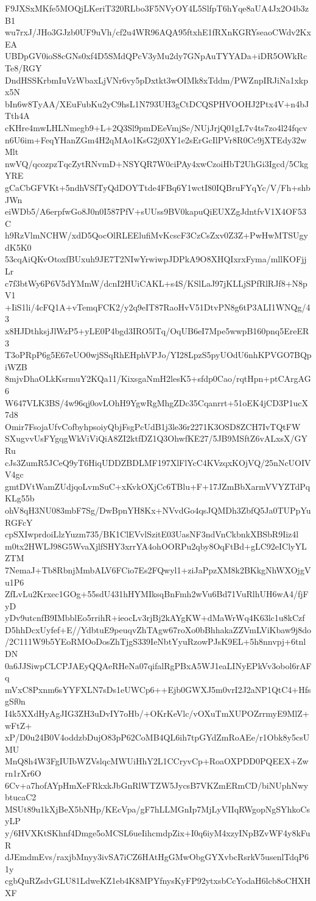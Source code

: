 F9JXSxMKfe5MOQjLKeriT320RLbo3F5NVyOY4L5SlfpT6hYqe8aUA4Jx2O4b3zB1
wu7rxJ/JHo3GJzb0UF9uVh/cf2u4WR96AQA95ftxhE1fRXnKGRYseaoCWdv2KxEA
UBDpGV0ioS8cGNs0xf4D5SMdQPcV3yMu2dy7GNpAuTYYADa+iDR5OWkRcTe8/RGY
DndHSSKrbmIuVzWbaxLjVNr6vy5pDxtkt3wOIMk8xTddm/PWZnpIRJiNa1xkpx5N
bIn6w8TyAA/XEuFubKu2yC9hsL1N793UH3gCtDCQSPHVOOHJ2Ptx4V+n4bJTth4A
cKHre4mwLHLNmegb9+L+2Q3Sl9pmDEeVmjSe/NUjJrjQ01gL7v4ts7zo4l24fqcv
n6U6im+FeqYHanZGm4H2qMAo1KsG2j0XY1e2sErGcIlPVr8R0Cc9jXTEdy32wMlt
nwVQ/qcozpzTqcZytRNvmD+NSYQR7W0ciPAy4xwCzoiHbT2UhGi3Igcd/5CkgYRE
gCaCbGFVKt+5ndhVSfTyQdDOYTtde4FBq6Y1wctI80IQBruFYqYc/V/Fh+shbJWn
eiWDb5/A6erpfwGo8J0n0I587PfV+sUUss9BV0kapuQiEUXZgJdntfvV1X4OF53C
h9RzVlmNCHW/xdD5QocOlRLEElufiMvKcscF3CzCsZxv0Z3Z+PwHwMTSUgydK5K0
53cqAiQKvOtoxfBUxuh9JE7T2NIwYrwiwpJDPkA9O8XHQIxrxFyma/mllKOFjjLr
c7f3btWy6P6V5dYMmW/dcnI2HUiCAKL+s4S/KSlLaJ97jKLLjSPfRlRJf8+N8pV1
+IiS1li/4cFQ1A+vTemqFCK2/y2q9eIT87RaoHvV51DtvPN8g6tP3ALI1WNQg/43
x8HJDthksjJlWzP5+yLE0P4bgd3IRO5lTq/OqUB6eI7Mpe5wwpB160pnq5EreER3
T3oPRpP6g5E67eUO0wjSSqRhEHphVPJo/YI28LpzS5pyUOdU6nhKPVGO7BQpiWZB
8mjvDhaOLkKsrmuY2KQa11/KixsgaNmH2lesK5+sfdp0Cao/rqtHpn+ptCArgAG6
W647VLK3BS/4w96qj0ovLOhH9YgwRgMhgZDc35Cqanrrt+51oEK4jCD3P1ucX7d8
Omir7FsojaUfvCofbyhpsoiyQbjFsgPcUdB1j3le36r2271K3OSD8ZCH7IvTQtFW
SXugvvUsFYgqgWkViViQiA8ZI2ktfDZ1Q3OhwfKE27/5JB9MSftZ6vALxsX/GYRu
cJs3ZumR5JCeQ9yT6HiqUDDZBDLMF197XlFlYcC4KVzqxKOjVQ/25nNcUOIVV4gc
gmtDVtWamZUdjqoLvmSuC+xKvkOXjCc6TBlu+F+17JZmBbXarmVVYZTdPqKLg55b
ohV8qH3NU083mbF7Sg/DwBpnYH8Kx+NVvdGo4qsJQMDh3ZbfQ5Ja0TUPpYuRGFcY
cpSXIwprdoiLlzYuzm735/BK1ClEVvlSzitE03UasNF3ndVnCkbnkXBSbR9Iiz4l
m0tx2HWLJ98G5WvaXjlfSHY3xrrYA4ohOORPu2qby8OqFtBd+gLC92eIClyYLZTM
7NemaJ+Tb8RbnjMmbALV6FCio7Es2FQwyl1+ziJaPpzXM8k2BKkgNhWXOjgVu1P6
ZfLvLu2Krxec1GOg+55sdU431hHYMIksqBnFmh2wVu6Bd71VuRlhUH6wA4/fjFyD
yDv9utcnfB9IMbblEo5rrihR+ieocLv3rjBj2kAYgKW+dMaWrWq4K63lc1u8kCzf
D5hhDcxUyfef+E//YdbtuE9peuqvZhTAgw67roXo0bBhhakaZZVmLViKbaw9j8do
/2C111W9b5YEoRMOoDosZhTjgS339IeNbtYyuRzowPJsK9EL+5h8nnvpj+6tnlDN
0a6JJSiwpCLCPJAEyQQAeRHeNa07qifalRgPBxA5WJ1eaLINyEPkVv3obol6rAFq
mVxC8Pxnm6sYYFXLN7sDs1eUWCp6++Ejb0GWXJ5m0vrI2J2aNP1QtC4+HfsgSf0n
I4k5XXdHyAgJIG3ZH3uDvIY7oHb/+OKrKeVlc/vOXuTmXUPOZrrmyE9MlZ+wFtZ+
xP/D0u24B0V4oddzbDujO83pP62CoMB4QL6ih7tpGYdZmRoAEe/r1Obk8y5csUMU
MnQ8h4W3FgIUIbWZVslqcMWUiHhY2L1CCryvCp+RoaOXPDD0PQEEX+Zwrn1rXr6O
6Cv+a7hofAYpHmXeFRkxkJbGnRlWTZW5JycsB7VKZmERmCD/biNUphNwybtucaC2
MSUt89u1kXjBeX5bNHp/KEcVpa/gF7hLLMGnIp7MjLyVIIqRWgopNgSYhkoCsyLP
y/6HVXKtSKhnf4Dmge5oMCSL6ueIihcmdpZix+I0q6iyM4xzyINpBZvWF4y8kFuR
dJEmdmEvs/raxjbMnyy3ivSA7iCZ6HAtHgGMwObgGYXvbcRsrkV5usenlTdqP61y
cgbQuRZsdvGLU81LdweKZ1eb4K8MPYfnysKyFP92ytxsbCcYodaH6lcb8oCHXHXF
